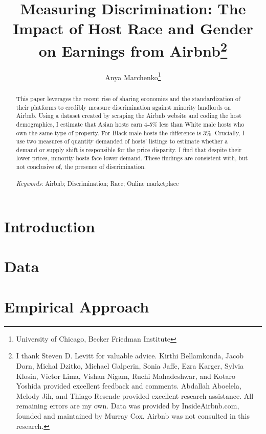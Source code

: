 \documentclass[11pt, oneside]{article}
\begin{document}
		
	\title{Measuring Discrimination: The Impact of Host Race and Gender on Earnings from Airbnb\footnote
		{I thank Steven D. Levitt for valuable advice. Kirthi Bellamkonda, Jacob Dorn, Michal Dzitko, Michael Galperin, Sonia Jaffe, Ezra Karger, Sylvia Klosin, Victor Lima, Vishan Nigam, Ruchi Mahadeshwar, and Kotaro Yoshida provided excellent feedback and comments. Abdallah Aboelela, Melody Jih, and Thiago Resende provided excellent research assistance. All remaining errors are my own. Data was provided by InsideAirbnb.com, founded and maintained by Murray Cox. Airbnb was not consulted in this research.}}
	\author{Anya Marchenko\footnote{University of Chicago, Becker Friedman Institute}}
	\maketitle
	
	\begin{abstract}
		This paper leverages the recent rise of sharing economies and the standardization of their platforms to credibly measure discrimination against minority landlords on Airbnb. Using a dataset created by scraping the Airbnb website and coding the host demographics, I estimate that Asian hosts earn 4-5\% less than White male hosts who own the same type of property. For Black male hosts the difference is 3\%. Crucially, I use two measures of quantity demanded of hosts' listings to estimate whether a demand or supply shift is responsible for the price disparity. I find that despite their lower prices, minority hosts face lower demand. These findings are consistent with, but not conclusive of, the presence of discrimination. 
		\\\\
		\textit{Keywords}: Airbnb; Discrimination; Race; Online marketplace
		
	\end{abstract}
	
	\newpage
	
	\singlespacing
	\section{Introduction}
	
	\label{lit}

	\section{Data}
	
	\label{data}
	
	\section{Empirical Approach}
	
	\label{empirical}
	
\end{document}
